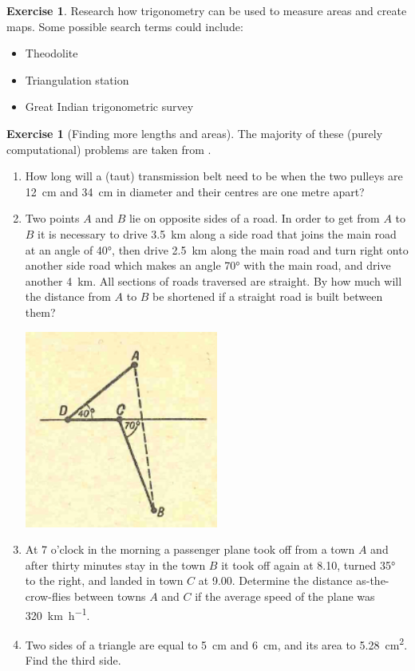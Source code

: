 \documentclass[a4paper]{report}
\theoremstyle{definition}
\newtheorem{exercise}[thm]{Exercise}
\begin{document}
  \begin{exercise}
    Research how trigonometry can be used to measure areas and create maps. Some possible search terms could include:
    \begin{itemize}
      \item Theodolite
      \item Triangulation station
      \item Great Indian trigonometric survey
    \end{itemize}
  \end{exercise}

  \begin{exercise}[Finding more lengths and areas]
    The majority of these (purely computational) problems are taken from \autocite{kutepov}.
    \begin{enumerate}
      \item How long will a  (taut) transmission belt need to be when the two pulleys are \SI{12}{\centi\metre} and \SI{34}{\centi\metre}
            in diameter and their centres are one metre apart?
      \item Two points $ A $ and $ B $ lie on opposite sides of a road. In order to get from $ A $ to $ B $ it is necessary to
            drive \SI{3.5}{\kilo\metre} along a side road that joins the main road at an angle of \ang{40}, then drive \SI{2.5}{\kilo\metre}
            along the main road and turn right onto another side road which makes an angle \ang{70} with the main road, and drive
            another \SI{4}{\kilo\metre}. All sections of roads traversed are straight. By how much will the distance from $ A $ to $ B $
            be shortened if a straight road is built between them?
            \begin{center}
              \includegraphics[width=0.5\textwidth]{roads}
            \end{center}
      \item At 7 o'clock in the morning a passenger plane took off from a town $ A $ and after thirty minutes stay in the town $ B $
            it took off again at 8.10, turned \ang{35} to the right, and landed in town $ C $ at 9.00. Determine the distance as-the-crow-flies
            between towns $ A $ and $ C $ if the average speed of the plane was \SI{320}{\kilo\metre\per\hour}.
      \item Two sides of a triangle are equal to \SI{5}{\centi\metre} and \SI{6}{\centi\metre}, and its area to \SI{5.28}{\centi\metre\squared}.
            Find the third side.
    \end{enumerate}
  \end{exercise}
\end{document}

